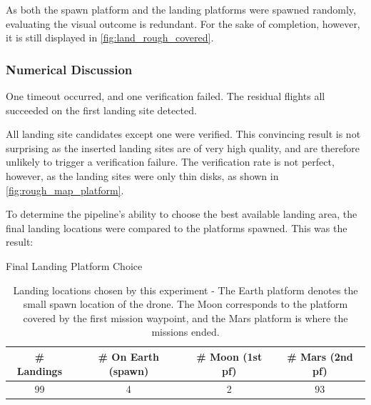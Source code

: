         As both the spawn platform and the landing platforms were spawned randomly, evaluating the visual outcome is redundant. For the sake of completion, however, it is still displayed in \cref{fig:land_rough_covered}.

        \subsubsection{Numerical Discussion}
        One timeout occurred, and one verification failed. The residual flights all succeeded on the first landing site detected.

        
        All landing site candidates except one were verified. This convincing result is not surprising as the inserted landing sites are of very high quality, and are therefore unlikely to trigger a verification failure. The verification rate is not perfect, however, as the landing sites were only thin disks, as shown in \cref{fig:rough_map_platform}. 

        To determine the pipeline's ability to choose the best available landing area, the final landing locations were compared to the platforms spawned. This was the result:

        \begin{table}[h]
            \begin{center}
             \caption{Final Landing Platform Choice}\vspace{1ex}
             \label{tab:final_landing_platform}
             \begin{tabular}{|c|c|c|c|}
             \hline
             \# Landings & \# On Earth (spawn) & \# Moon (1st pf)  & \# Mars (2nd pf)\\ \hline \hline
             99 & 4 & 2 & 93 \\
             \hline
            \end{tabular}
        \end{center}
        \caption{Landing locations chosen by this experiment - The Earth platform denotes the small spawn location of the drone. The Moon corresponds to the platform covered by the first mission waypoint, and the Mars platform is where the missions ended.}
        \end{table}

